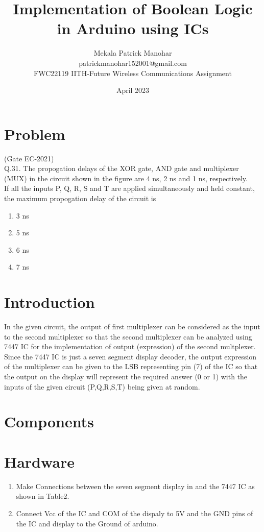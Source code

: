 \documentclass{article}
\title{Implementation of Boolean Logic in Arduino using ICs}
\date{April 2023}
\author{Mekala Patrick Manohar\\ patrickmanohar152001@gmail.com\\ FWC22119 IITH-Future Wireless Communications Assignment}
\begin{document}
\maketitle
	\tableofcontents

\section{Problem} 
		(Gate EC-2021)\\
Q.31. The propogation delays of the XOR gate, AND gate and multiplexer (MUX) in the circuit shown in the figure are 4 ns, 2 ns and 1 ns, respectively.\\

If all the inputs P, Q, R, S and T are applied simultaneously and held constant, the maximum propogation delay of the circuit is
\begin{enumerate}
	\item 3 ns \item 5 ns \item 6 ns \item 7 ns
\end{enumerate}
\section{Introduction}
		In the given circuit, the output of first multiplexer can be considered as the input to the second multiplexer so that the second multiplexer can be analyzed using 7447 IC for the implementation of output (expression) of the second multplexer. Since the 7447 IC is just a seven segment display decoder, the output expression of the multiplexer can be given to the LSB representing pin (7) of the IC so that the output on the display will represent the required answer (0 or 1) with the inputs of the given circuit (P,Q,R,S,T) being given at random.
\section{Components}
		
\section{Hardware}
		\begin{enumerate}
			\item Make Connections between the seven segment display in and the 7447 IC as shown in Table2.
				
			\item Connect Vcc of the IC and COM of the dispaly to 5V and the GND pins of the IC and display to the Ground of arduino.
		\end{enumerate}
\end{document}
